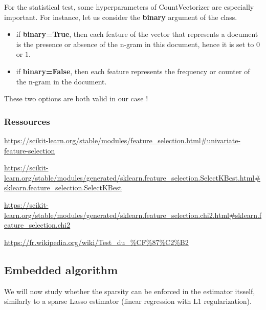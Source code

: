 \documentclass[
10pt, %
a4paper, %
oneside, %
headinclude,footinclude, %
BCOR5mm, %
]{scrartcl}
\begin{document}
For the statistical test, some hyperparameters of CountVectorizer are especially important. For instance, let us consider the \textbf{binary} argument of the class.
\begin{itemize}
    \item if \textbf{binary=True}, then each feature of the vector that
        represents a document is the presence or absence of the n-gram in this
        document, hence it is set to $0$ or $1$.
    \item if \textbf{binary=False}, then each feature represents the frequency or counter of the n-gram in the document.
\end{itemize}

These two options are both valid in our case !

\subsubsection{Ressources}

\url{https://scikit-learn.org/stable/modules/feature_selection.html#univariate-feature-selection} 

\url{https://scikit-learn.org/stable/modules/generated/sklearn.feature_selection.SelectKBest.html#sklearn.feature_selection.SelectKBest} 

\url{https://scikit-learn.org/stable/modules/generated/sklearn.feature_selection.chi2.html#sklearn.feature_selection.chi2} 

\url{https://fr.wikipedia.org/wiki/Test_du_%CF%87%C2%B2} 

\subsection{Embedded algorithm}

We will now study whether the sparsity can be enforced in the estimator itsself, similarly to a sparse Lasso estimator (linear regression with L1 regularization).
\\

{}
\\
\end{document}

